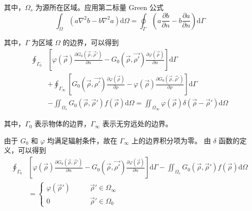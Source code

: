 \par 其中，$\Omega_{s}$ 为源所在区域。应用第二标量 Green 公式
\begin{equation}
    \int_{\Omega} 
    (a\nabla^2 b-b\nabla^2 a)
    \text{d}\Omega
    =\oint_{\Gamma}
    \left(
        a \frac{\partial b}{\partial n}
        -b \frac{\partial a}{\partial n}
    \right)
    \text{d}\Gamma
\end{equation}
\par 其中，$\Gamma$ 为区域 $\Omega$ 的边界，可以得到
\begin{equation}
    \begin{aligned}
        \oint_{\Gamma_0}&\left[
            \varphi(\vec{\rho}) \frac{\partial G_0(\vec{\rho}, \vec{\rho}')}{\partial n}
            -G_0(\vec{\rho}, \vec{\rho'}) \frac{\partial \varphi(\vec{\rho})}{\partial n}
        \right]
        \text{d}\Gamma\\
        &+\oint_{\Gamma_{\infty}}\left[
            G_0(\vec{\rho}, \vec{\rho'}) \frac{\partial \varphi(\vec{\rho})}{\partial \rho}
            -\varphi(\vec{\rho}) \frac{\partial G_0(\vec{\rho}, \vec{\rho}')}{\partial \rho}
        \right]
        \text{d}\Gamma\\
        &-\iint_{\Omega_{s}}
        G_0(\vec{\rho}, \vec{\rho}') f(\vec{\rho}) \text{d}\Omega
        =
        \iint_{\Omega_{\infty}}
        \varphi(\vec{\rho}) \delta(\vec{\rho}-\vec{\rho}') \text{d}\Omega
    \end{aligned}
\end{equation}
\par 其中，$\Gamma_0$ 表示物体的边界，$\Gamma_{\infty}$ 表示无穷远处的边界。
\par 由于 $G_0$ 和 $\varphi$ 均满足辐射条件，故在 $\Gamma_{\infty}$ 上的边界积分项为零。
由 $\delta$ 函数的定义，可以得到
\begin{equation}
    \begin{aligned}
        \oint_{\Gamma_0}&\left[
            \varphi(\vec{\rho}) \frac{\partial G_0(\vec{\rho}, \vec{\rho}')}{\partial n}
            -G_0(\vec{\rho}, \vec{\rho'}) \frac{\partial \varphi(\vec{\rho})}{\partial n}
        \right]
        \text{d}\Gamma
        -\iint_{\Omega_{s}}
        G_0(\vec{\rho}, \vec{\rho}') f(\vec{\rho}) \text{d}\Omega\\
        &=\left\{
            \begin{aligned}
                \varphi(\vec{\rho}') \qquad &\vec{\rho}' \in \Omega_{\infty} \\
                0 \qquad \quad &\vec{\rho}' \in \Omega_{0}
            \end{aligned}
        \right.
    \end{aligned}
\end{equation}
